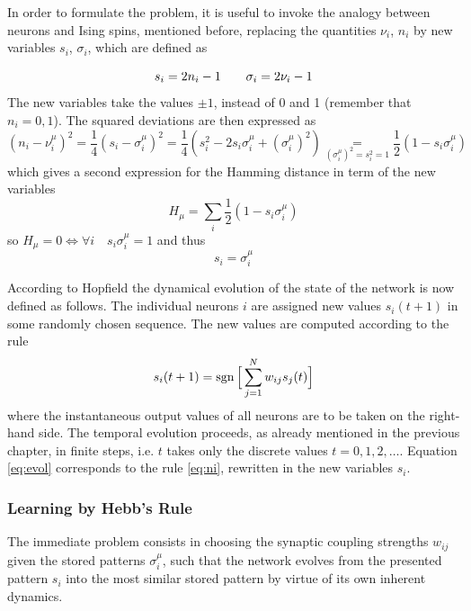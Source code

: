 In order to formulate the problem, it is useful to invoke the analogy between neurons and Ising spins, mentioned before, replacing the quantities $\nu_{i}$, $n_i$ by new variables $s_{i}$, $\sigma_{i}$, which are defined as

\begin{equation}
\centering
    s_{i}=2n_{i}-1 \qquad \sigma_{i}=2\nu_{i}-1
\end{equation}
The new variables take the values $\pm1$, instead of 0 and 1 (remember that $n_{i}=0,1$). 
The squared deviations are then expressed as
\begin{equation}
    (n_{i}-\nu_{i}^{\mu})^2=\frac{1}{4}(s_{i}-\sigma_{i}^{\mu})^2=\frac{1}{4}(s_{i}^2-2 s_{i}\sigma_{i}^{\mu}+(\sigma_{i}^{\mu})^2)\underset{(\sigma_{i}^{\mu})^2=s_{i}^2=1}{=}\frac{1}{2}(1-s_{i}\sigma_{i}^{\mu})
\end{equation}
which gives a second expression for the Hamming distance in term of the new variables
\begin{equation}
     H_{\mu}=\sum_{i}\frac{1}{2}(1-s_{i}\sigma_{i}^{\mu})
\end{equation}
so $ H_{\mu}=0 \Leftrightarrow \forall i \quad s_{i}\sigma_{i}^{\mu}=1$ and thus \[s_{i}=\sigma_{i}^{\mu}\]

According to Hopfield the dynamical evolution of the state of the network is now defined as follows. The individual neurons $i$ are assigned new values $s_i(t + 1)$ in some randomly chosen sequence. The new values are computed according to the rule
\begin{equation}
    s_i(t + 1)=\operatorname{sgn}{\Big[\sum_{j=1}^{N}w_{ij}s_{j}(t)\Big]}
    \label{eq:evol}
\end{equation}
where the instantaneous output values of all neurons are to be taken on the right-hand side. The temporal evolution proceeds, as already mentioned in the previous chapter, in finite steps, i.e. $t$ takes only the discrete values $t = 0,1,2, \dots$. Equation \ref{eq:evol} corresponds to the rule \ref{eq:ni}, rewritten in the new variables $s_{i}$.


\subsubsection{Learning by Hebb's Rule}
The immediate problem consists in choosing the synaptic coupling strengths
$w_{ij}$ given the stored patterns $\sigma_{i}^{\mu}$, such that the network evolves from the presented pattern $s_i$ into the most similar stored pattern by virtue of its own inherent dynamics. 

